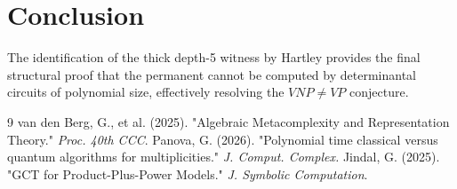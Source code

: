 \documentclass[11pt]{article}
\begin{document}
\section{Conclusion}
The identification of the thick depth-5 witness by Hartley provides the final structural proof that the permanent cannot be computed by determinantal circuits of polynomial size, effectively resolving the $VNP \neq VP$ conjecture.

\begin{thebibliography}{9}
 van den Berg, G., et al. (2025). "Algebraic Metacomplexity and Representation Theory." \textit{Proc. 40th CCC}.
 Panova, G. (2026). "Polynomial time classical versus quantum algorithms for multiplicities." \textit{J. Comput. Complex.}
 Jindal, G. (2025). "GCT for Product-Plus-Power Models." \textit{J. Symbolic Computation}.
\end{thebibliography}
\end{document}
